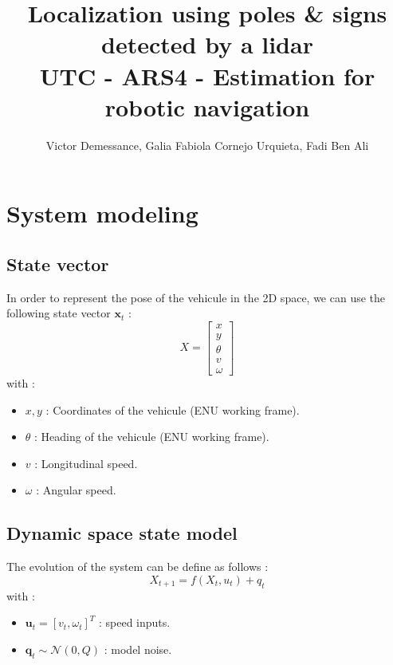 \documentclass[conference]{IEEEtran}
\begin{document}
\title{
  Localization using poles \& signs detected by a lidar 
  \\
  \large UTC - ARS4 - Estimation for robotic navigation
}

\author{Victor Demessance, Galia Fabiola Cornejo Urquieta, Fadi Ben Ali}

\maketitle

\section{System modeling}

\vspace{2mm}

\subsection{State vector}

\noindent In order to represent the pose of the vehicule in the 2D space, we can use the following state vector \( \mathbf{x}_t \) :
\[
X = 
\begin{bmatrix}
x \\ 
y \\ 
\theta \\ 
v \\ 
\omega
\end{bmatrix}
\]
with :
\begin{itemize}
    \item \( x, y \) : Coordinates of the vehicule (ENU working frame).
    \item \( \theta \) : Heading of the vehicule (ENU working frame).
    \item \( v \) : Longitudinal speed.
    \item \( \omega \) : Angular speed.
\end{itemize}

\subsection{Dynamic space state model}

\noindent The evolution of the system can be define as follows :
\[
X_{t+1} = f(X_t, u_t) + q_t
\]
with :
\begin{itemize}
    \item $\mathbf{u}_t = [v_t, \omega_t]^T$ : speed inputs.
    \item $\mathbf{q}_t \sim \mathcal{N}(0, Q)$ : model noise.
\end{itemize}
\end{document}
